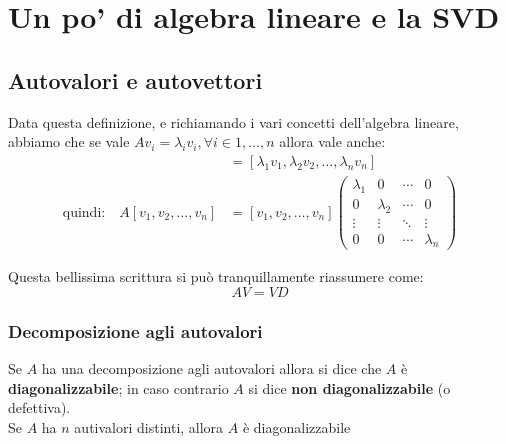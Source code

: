 \chapter{Un po' di algebra lineare e la SVD}

\section{Autovalori e autovettori}
Data questa definizione, e richiamando i vari concetti dell'algebra lineare, abbiamo che se vale $Av_{i} = \lambda_{i}v_{i},\forall i\in {1,\dots, n}$ allora vale anche:
\begin{align*}
    [A v_1, A v_2, \dots, A v_n] &= [\lambda_1 v_1, \lambda_2 v_2, \dots, \lambda_n v_n] \\
    \text{quindi:} \quad A[v_1, v_2, \dots, v_n] &= [v_1, v_2, \dots, v_n] \begin{pmatrix}
        \lambda_1 & 0 & \cdots & 0 \\
        0 & \lambda_2 & \cdots & 0 \\
        \vdots & \vdots & \ddots & \vdots \\
        0 & 0 & \cdots & \lambda_n
        \end{pmatrix}        
\end{align*}

Questa bellissima scrittura si può tranquillamente riassumere come: \[AV=VD\]

\subsection{Decomposizione agli autovalori}
Se $A$ ha una decomposizione agli autovalori
allora si dice che $A$ è \textbf{diagonalizzabile}; in
caso contrario $A$ si dice \textbf{non
diagonalizzabile} (o defettiva). \\

Se $A$ ha $n$ autivalori distinti, allora $A$ è diagonalizzabile

